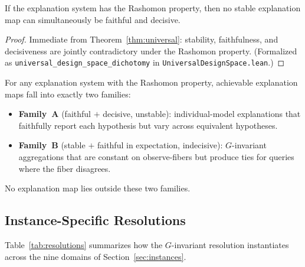 \documentclass[twoside]{jmlr}
\begin{document}
\begin{proposition}
\label{prop:dichotomy}
If the explanation system has the Rashomon property, then no stable
explanation map can simultaneously be faithful and decisive.
\end{proposition}

\begin{proof}
Immediate from Theorem~\ref{thm:universal}: stability, faithfulness, and
decisiveness are jointly contradictory under the Rashomon property.
(Formalized as \texttt{universal\_design\_space\_dichotomy} in
\texttt{UniversalDesignSpace.lean}.)
\end{proof}

\begin{corollary}
\label{cor:pareto}
For any explanation system with the Rashomon property, achievable
explanation maps fall into exactly two families:
\begin{itemize}
  \item \textbf{Family~A} (faithful $+$ decisive, unstable): individual-model
    explanations that faithfully report each hypothesis but vary across
    equivalent hypotheses.
  \item \textbf{Family~B} (stable $+$ faithful in expectation, indecisive):
    $G$-invariant aggregations that are constant on observe-fibers but
    produce ties for queries where the fiber disagrees.
\end{itemize}
No explanation map lies outside these two families.
\end{corollary}

\subsection{Instance-Specific Resolutions}
\label{sec:resolution-instances}

Table~\ref{tab:resolutions} summarizes how the $G$-invariant resolution
instantiates across the nine domains of Section~\ref{sec:instances}.
\end{document}
